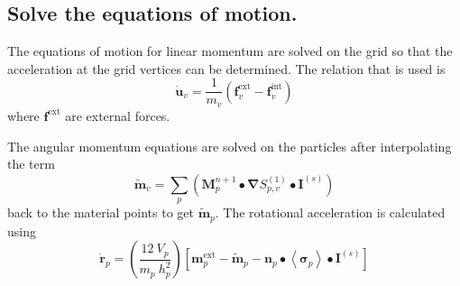     \subsection{ Solve the equations of motion.}
      The equations of motion for linear momentum are solved on the grid
      so that the acceleration at the grid vertices can be determined.
      The relation that is used is
      \begin{equation}
        \mathbf{\dot{u}}_v = \frac{1}{m_v}\left(\mathbf{f}_v^{\text{ext}} -
                                 \mathbf{f}_v^{\text{int}}\right)
      \end{equation}
      where $\mathbf{f}^{\text{ext}}$ are external forces.  

      The angular momentum equations are solved on the particles after
      interpolating the term 
      \begin{equation}
        \mathbf{\tilde{m}}_v = 
          \sum_p\left(\mathbf{M}_p^{n+1}\bullet
            \boldsymbol{\nabla}S^{(1)}_{p,v}
            \bullet\mathbf{I}^{(s)}\right)
      \end{equation}
      back to the material points to get $\mathbf{\tilde{m}}_p$.  The 
      rotational acceleration is calculated using
      \begin{equation}
        \dot{\mathbf{r}}_p = \left(\frac{12~V_p}{m_p~h^2_p}\right) 
          \left[\mathbf{m}_p^{\text{ext}} - \mathbf{\tilde{m}}_p
          - \mathbf{n}_p\bullet\left<\boldsymbol{\sigma}_p\right>\bullet
          \mathbf{I}^{(s)}\right]
        \label{eq:rotAcc}
      \end{equation}
